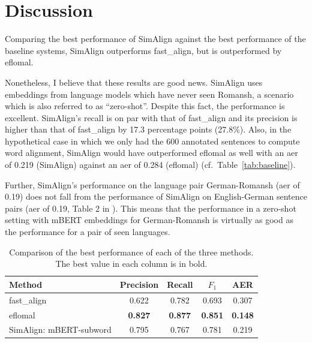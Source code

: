 \section{Discussion}\label{sec:discussion}
Comparing the best performance of SimAlign against the best performance of the baseline systems, SimAlign outperforms fast\_align, but is outperformed by eflomal.

Nonetheless, I believe that these results are good news. 
SimAlign uses embeddings from language models which have never seen Romansh, a scenario which is also referred to as \enquote{zero-shot}. 
Despite this fact, the performance is excellent. 
SimAlign's recall is on par with that of fast\_align and its precision is higher than that of fast\_align by 17.3 percentage points (27.8\%).
Also, in the hypothetical case in which we only had the 600 annotated sentences to compute word alignment, SimAlign would have outperformed eflomal as well with an \acrshort{aer} of 0.219  (SimAlign) against an \acrshort{aer} of 0.284 (eflomal) (cf.~Table~\ref{tab:baseline}). 

Further,  SimAlign's performance on the language pair German-Romansh (\acrshort{aer} of 0.19) does not fall from the performance of SimAlign on English-German sentence pairs (\acrshort{aer} of 0.19, Table 2 in \textcite{jalili-sabet-etal-2020-simalign}). This means that the performance in a zero-shot setting  with mBERT embeddings  for German-Romansh is virtually as good as the performance for a pair of seen languages.

\begin{table}
\centering
\begin{tabular}{lcccc}
	\toprule
							Method & Precision & Recall & $F_1$ & AER \\
\midrule
  fast\_align& 0.622	  & 0.782  & 0.693 & 0.307 \\

							eflomal     & \textbf{0.827} & \textbf{0.877} & \textbf{0.851} & \textbf{0.148} \\

SimAlign:                     mBERT-subword & 0.795   & 0.767  & 0.781  & 0.219 \\
\bottomrule
\end{tabular}
\caption[Comparison of the best performance of the three SimAlign methods]{Comparison of the best performance of each of the three methods. 
The best value in each column is in bold.}
\label{tab:comparison}
\end{table}

